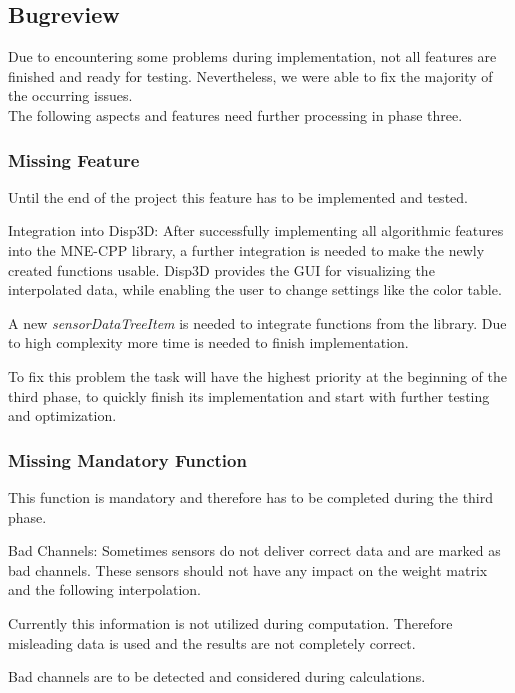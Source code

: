 \subsection{Bugreview}
Due to encountering some problems during implementation, not all features are finished and ready for testing.
Nevertheless, we were able to fix the majority of the occurring issues. \\ 
The following aspects and features need further processing in phase three. 

\subsubsection{Missing Feature}
Until the end of the project this feature has to be implemented and tested.

\begin{aims}
	\item[\hspace*{11mm} Integration into Disp3D:] After successfully implementing all algorithmic features into the MNE-CPP library, a further integration is needed to make the newly created functions usable. Disp3D provides the GUI for visualizing the interpolated data, while enabling the user to change settings like the color table.
	
	A new \textit{sensorDataTreeItem} is needed to integrate functions from the library. Due to high complexity more time is needed to finish implementation.
	
	To fix this problem the task will have the highest priority at the beginning of the third phase, to quickly finish its implementation and start with further testing and optimization. 
	
	
\end{aims}

\subsubsection{Missing Mandatory Function}
This function is mandatory and therefore has to be completed during the third phase.

\begin{aims}
	\item[\hspace*{11mm} Bad Channels:]Sometimes sensors do not deliver correct data and are marked as bad channels. These sensors should not have                          					   any impact on the weight matrix and the following interpolation. 
	
					   Currently this information is not utilized during computation. Therefore misleading data is used and the 							   results are not completely correct.  
					  
					   Bad channels are to be detected and considered during calculations. 
\end{aims}

